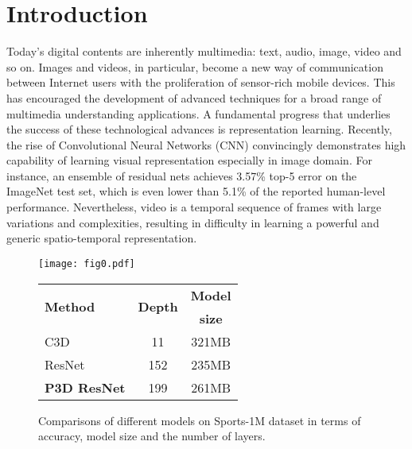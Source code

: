 \documentclass[10pt,twocolumn,letterpaper]{article}
\begin{document}
\section{Introduction}
Today's digital contents are inherently multimedia: text, audio, image, video and so on. Images and videos, in particular, become a new way of communication between Internet users with the proliferation of sensor-rich mobile devices. This has encouraged the development of advanced techniques for a broad range of multimedia understanding applications. A fundamental progress that underlies the success of these technological advances is representation learning. Recently, the rise of Convolutional Neural Networks (CNN) convincingly demonstrates high capability of learning visual representation especially in image domain. For instance, an ensemble of residual nets \cite{he2015deep} achieves 3.57\% top-5 error on the ImageNet test set, which is even lower than 5.1\% of the reported human-level performance. Nevertheless, video is a temporal sequence of frames with large variations and complexities, resulting in difficulty in learning a powerful and generic spatio-temporal representation.

\begin{figure}
  \begin{minipage}{0.26\textwidth}
    \centering
    \texttt{[image: fig0.pdf]}
  \end{minipage}
  \begin{minipage}{0.18\textwidth}
    \centering
    \scriptsize
    \begin{tabular}{l|c|c} \hline
      \multirow{2}{*}{\textbf{Method}} & \multirow{2}{*}{\textbf{Depth}}     & \textbf{Model} \\
                                       &                                     & \textbf{size} \\ \hline
      C3D                              & 11                                  & 321MB \\
      ResNet                           & 152                                 & 235MB \\ \hline
      \textbf{P3D ResNet}              & 199                                 & 261MB \\
      \hline
    \end{tabular}
  \end{minipage}
  \caption{\small Comparisons of different models on Sports-1M dataset in terms of accuracy, model size and the number of layers.}
     \label{fig:fig0}
  \vspace{-0.2in}
\end{figure}
\end{document}
